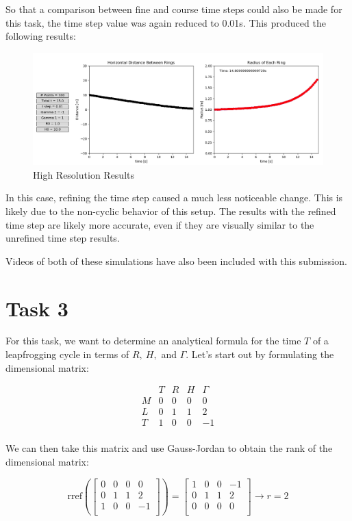 \documentclass[10pt]{article}
\begin{document}
So that a comparison between fine and course time steps could also be made for this task, the time step value was again reduced to 0.01s. This produced the following results:


\begin{figure}[H]
   \centering
   \includegraphics[width=1\linewidth]{figures/task2_fine.png}
   \caption{High Resolution Results}
   \label{task2_fine}
\end{figure}

In this case, refining the time step caused a much less noticeable change. This is likely due to the non-cyclic behavior of this setup. The results with the refined time step are likely more accurate, even if they are visually similar to the unrefined time step results.

Videos of both of these simulations have also been included with this submission.


\section{Task 3}
For this task, we want to determine an analytical formula for the time $T$ of a leapfrogging cycle in terms of $R,~H,$ and $\Gamma$. Let's start out by formulating the dimensional matrix:

\[\begin{matrix}
 & T & R & H & \Gamma \\ \hline
M & 0 & 0 & 0 & 0 \\
L & 0 & 1 & 1 & 2 \\
T & 1 & 0 & 0 & -1 \\
\end{matrix}\]

We can then take this matrix and use Gauss-Jordan to obtain the rank of the dimensional matrix:

\[\text{rref}\left(
\begin{bmatrix}
0 & 0 & 0 & 0 \\
0 & 1 & 1 & 2 \\
1 & 0 & 0 & -1 \\
\end{bmatrix} \right)
=
\begin{bmatrix}
1 & 0 & 0 & -1 \\
0 & 1 & 1 & 2 \\
0 & 0 & 0 & 0 \\
\end{bmatrix}
\rightarrow r=2
\]
\end{document}
